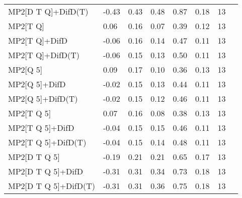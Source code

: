 \begin{table}
\begin{tabular}{l l l l l l l l }
    MP2[D T Q]+DifD(T) & -0.43 & 0.43 & 0.48 & 0.87 & 0.18 & 13 \\ 
    MP2[T Q] & 0.06 & 0.16 & 0.07 & 0.39 & 0.12 & 13 \\ 
    MP2[T Q]+DifD & -0.06 & 0.16 & 0.14 & 0.47 & 0.11 & 13 \\ 
    MP2[T Q]+DifD(T) & -0.06 & 0.15 & 0.13 & 0.50 & 0.11 & 13 \\ 
    MP2[Q 5] & 0.09 & 0.17 & 0.10 & 0.36 & 0.13 & 13 \\ 
    MP2[Q 5]+DifD & -0.02 & 0.15 & 0.13 & 0.44 & 0.11 & 13 \\ 
    MP2[Q 5]+DifD(T) & -0.02 & 0.15 & 0.12 & 0.46 & 0.11 & 13 \\ 
    MP2[T Q 5] & 0.07 & 0.16 & 0.08 & 0.38 & 0.13 & 13 \\ 
    MP2[T Q 5]+DifD & -0.04 & 0.15 & 0.15 & 0.46 & 0.11 & 13 \\ 
    MP2[T Q 5]+DifD(T) & -0.04 & 0.15 & 0.14 & 0.48 & 0.11 & 13 \\ 
    MP2[D T Q 5] & -0.19 & 0.21 & 0.21 & 0.65 & 0.17 & 13 \\ 
    MP2[D T Q 5]+DifD & -0.31 & 0.31 & 0.34 & 0.73 & 0.18 & 13 \\ 
    MP2[D T Q 5]+DifD(T) & -0.31 & 0.31 & 0.36 & 0.75 & 0.18 & 13 \\ 
    \bottomrule
  \end{tabular}
\end{table}
